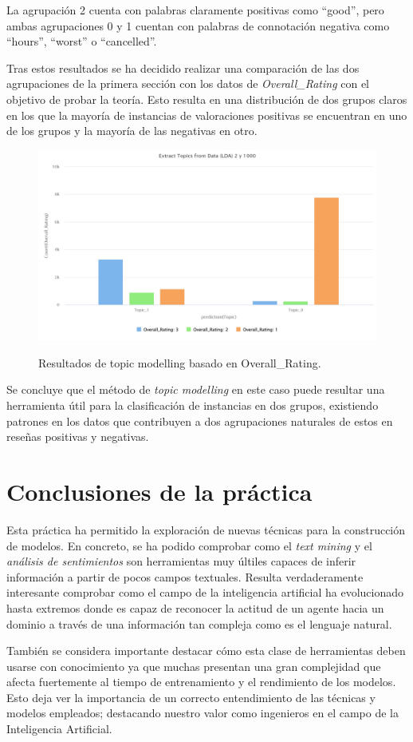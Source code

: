 \documentclass[es]{uc3mreport}
\begin{document}
\begin{report}
La agrupación 2 cuenta con palabras claramente positivas como ``good'', pero
ambas agrupaciones 0 y 1 cuentan con palabras de connotación negativa como
``hours'', ``worst'' o ``cancelled''.

Tras estos resultados se ha decidido realizar una comparación de las dos
agrupaciones de la primera sección con los datos de \textit{Overall\_Rating} con el
objetivo de probar la teoría. Esto resulta en una distribución de dos grupos
claros en los que la mayoría de instancias de valoraciones positivas se
encuentran en uno de los grupos y la mayoría de las negativas en otro.

\begin{figure}
    \center
    \includegraphics[width=0.85\linewidth]{graph_2topic_1000iter_rating.jpeg}\\
    \caption{Resultados de topic modelling basado en Overall\_Rating.}
\end{figure}

Se concluye que el método de \textit{topic modelling} en este caso puede resultar una
herramienta útil para la clasificación de instancias en dos grupos, existiendo
patrones en los datos que contribuyen a dos agrupaciones naturales de estos en
reseñas positivas y negativas.

\section{Conclusiones de la práctica}
\label{chap:conclusion}

Esta práctica ha permitido la exploración de nuevas técnicas para la construcción de
modelos. En concreto, se ha podido comprobar como el \textit{text mining} y el
\textit{análisis de sentimientos} son herramientas muy últiles capaces de
inferir información a partir de pocos campos textuales. Resulta
verdaderamente interesante comprobar como el campo de la inteligencia
artificial ha evolucionado hasta extremos donde es capaz de reconocer la
actitud de un agente hacia un dominio a través de una información tan compleja
como es el lenguaje natural.

También se considera importante destacar cómo esta clase de herramientas deben usarse con
conocimiento ya que muchas presentan una gran complejidad que afecta
fuertemente al tiempo de entrenamiento y el rendimiento de los modelos. Esto
deja ver la importancia de un correcto entendimiento de las técnicas y
modelos empleados; destacando nuestro valor como ingenieros en el campo de la
Inteligencia Artificial.

  \end{report}
\end{document}
